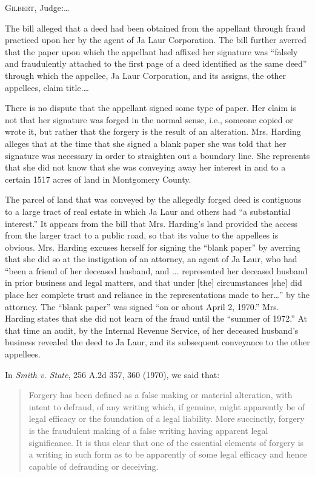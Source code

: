 
\textsc{Gilbert}, Judge:\ldots

The bill alleged that a deed had been obtained from the appellant through fraud
practiced upon her by the agent of Ja Laur Corporation. The bill further
averred that the paper upon which the appellant had affixed her signature was
``falsely and fraudulently attached to the first page of a deed identified as
the same deed'' through which the appellee, Ja Laur Corporation, and its
assigns, the other appellees, claim title.\ldots

There is no dispute that the appellant signed some type of paper. Her claim is
not that her signature was forged in the normal sense, i.e., someone copied or
wrote it, but rather that the forgery is the result of an alteration. Mrs.
Harding alleges that at the time that she signed a blank paper she was told
that her signature was necessary in order to straighten out a boundary line.
She represents that she did not know that she was conveying away her interest
in and to a certain 1517 acres of land in Montgomery County. 

The parcel of land that was conveyed by the allegedly forged deed is contiguous
to a large tract of real estate in which Ja Laur and others had ``a substantial
interest.'' It appears from the bill that Mrs. Harding's land provided the
access from the larger tract to a public road, so that its value to the
appellees is obvious. Mrs. Harding excuses herself for signing the ``blank
paper'' by averring that she did so at the instigation of an attorney, an agent
of Ja Laur, who had ``been a friend of her deceased husband, and ...
represented her deceased husband in prior business and legal matters, and that
under [the] circumstances [she] did place her complete trust and reliance in
the representations made to her\ldots'' by the attorney. The ``blank paper'' was
signed ``on or about April 2, 1970.'' Mrs. Harding states that she did not
learn of the fraud until the ``summer of 1972.'' At that time an audit, by the
Internal Revenue Service, of her deceased husband's business revealed the deed
to Ja Laur, and its subsequent conveyance to the other appellees. 

In \textit{Smith v. State}, 256 A.2d 357, 360 (1970), we said that:
\begin{quote}
Forgery has been defined as a false making or material alteration, with intent
to defraud, of any writing which, if genuine, might apparently be of legal
efficacy or the foundation of a legal liability. More succinctly, forgery is
the fraudulent making of a false writing having apparent legal significance. It
is thus clear that one of the essential elements of forgery is a writing in
such form as to be apparently of some legal efficacy and hence capable of
defrauding or deceiving. 
\end{quote}


